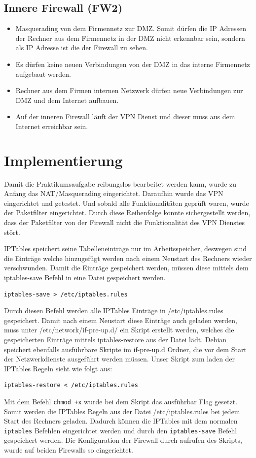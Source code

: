 \subsection{Innere Firewall (FW2)}
\begin{itemize}
\item Masquerading von dem Firmennetz zur DMZ. Somit dürfen die IP Adressen der Rechner aus dem Firmennetz in der DMZ nicht erkennbar sein, sondern als IP Adresse ist die der Firewall zu sehen.
\item Es dürfen keine neuen Verbindungen von der DMZ in das interne Firmennetz aufgebaut werden.
\item Rechner aus dem Firmen internen Netzwerk dürfen neue Verbindungen zur DMZ und dem Internet aufbauen.
\item Auf der inneren Firewall läuft der VPN Dienst und dieser muss aus dem Internet erreichbar sein.
\end{itemize}

\section{Implementierung}
Damit die Praktikumsaufgabe reibungslos bearbeitet werden kann, wurde zu Anfang das NAT/Masquerading eingerichtet. Daraufhin wurde das VPN eingerichtet und getestet. Und sobald alle Funktionalitäten geprüft waren, wurde der Paketfilter eingerichtet. Durch diese Reihenfolge konnte sichergestellt werden, dass der Paketfilter von der Firewall nicht die Funktionalität des VPN Dienstes stört.

IPTables speichert seine Tabelleneinträge nur im Arbeitsspeicher, deswegen sind die Einträge welche hinzugefügt werden nach einem Neustart des Rechners wieder verschwunden. Damit die Einträge gespeichert werden, müssen diese mittels dem iptables-save Befehl in eine Datei gespeichert werden.
\begin{lstlisting}
iptables-save > /etc/iptables.rules
\end{lstlisting}
Durch diesen Befehl werden alle IPTables Einträge in /etc/iptables.rules gespeichert. Damit nach einem Neustart diese Einträge auch geladen werden, muss unter /etc/network/if-pre-up.d/ ein Skript erstellt werden, welches die gespeicherten Einträge mittels iptables-restore aus der Datei lädt. Debian speichert ebenfalls ausführbare Skripte im if-pre-up.d Ordner, die vor dem Start der Netzwerkdienste ausgeführt werden müssen. Unser Skript zum laden der IPTables Regeln sieht wie folgt aus:
\begin{lstlisting}[caption={/etc/network/if-pre-up.d/iptables}]
iptables-restore < /etc/iptables.rules
\end{lstlisting}
Mit dem Befehl \texttt{chmod +x} wurde bei dem Skript das ausführbar Flag gesetzt. Somit werden die IPTables Regeln aus der Datei /etc/iptables.rules bei jedem Start des Rechners geladen. Dadurch können die IPTables mit dem normalen \texttt{iptables} Befehlen eingerichtet werden und durch den \texttt{iptables-save} Befehl gespeichert werden. Die Konfiguration der Firewall durch aufrufen des Skripts, wurde auf beiden Firewalls so eingerichtet.

